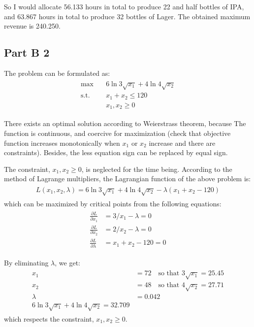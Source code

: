 \documentclass[fleqn,10pt]{wlscirep}
\begin{document}
So I would allocate 56.133 hours in total to produce 22 and half bottles of IPA, and 63.867 hours in total to produce 32 bottles of Lager. The obtained maximum revenue is 240.250.

\subsection{Part B 2}

The problem can be formulated as:
\begin{align} \begin{split}
    \max \quad & 6 \ln{3 \sqrt{x_{1}}} + 4 \ln{4 \sqrt{x_{2}}} \\
    \text{s.t.} \quad & x_{1} + x_{2} \leq 120 \\
    & x_{1}, x_{2} \geq 0
\end{split} \end{align} 

There exists an optimal solution according to Weierstrass theorem, because The function is continuous, and coercive for maximization (check that objective function increases monotonically when $x_{1}$ or $x_{2}$ increase and there are constraints). Besides, the less equation sign can be replaced by equal sign.

The constraint, $x_{1}, x_{2} \geq 0$, is neglected for the time being. According to the method of Lagrange multipliers, the Lagrangian function of the above problem is:
\begin{align} \begin{split}
    L(x_{1}, x_{2}, \lambda) = 6 \ln{3 \sqrt{x_{1}}} + 4 \ln{4 \sqrt{x_{2}}} - \lambda (x_{1} + x_{2} - 120)
\end{split} \end{align} 
which can be maximized by critical points from the following equations:
\begin{align} \begin{split}
    \frac{\partial L}{\partial x_{1}} &= 3 / x_{1} - \lambda = 0 \\
    \frac{\partial L}{\partial x_{2}} &= 2 / x_{2} - \lambda = 0 \\
    \frac{\partial L}{\partial \lambda} &= x_{1} + x_{2} - 120 = 0
\end{split} \end{align} 

By eliminating $\lambda$, we get:
\begin{align} \begin{split}
    x_{1} &= 72 \quad \text{so that  } 3 \sqrt{x_{1}} = 25.45 \\
    x_{2} &= 48 \quad \text{so that  } 4 \sqrt{x_{2}} = 27.71 \\
    \lambda &= 0.042 \\
    6 \ln{3 \sqrt{x_{1}}} + 4 \ln{4 \sqrt{x_{2}}} = 32.709
\end{split} \end{align} 
which respects the constraint, $x_{1}, x_{2} \geq 0$.
\end{document}
